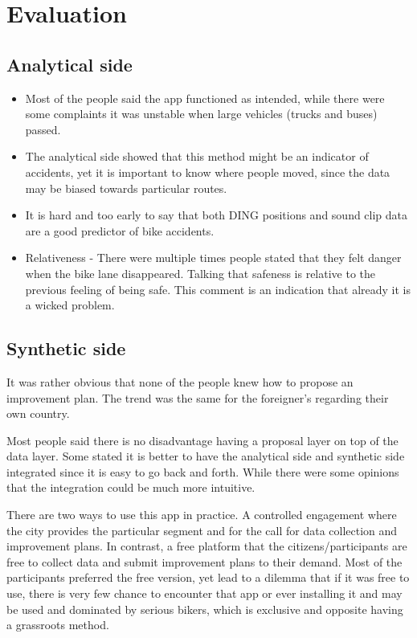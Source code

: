 \section{Evaluation}
\subsection{Analytical side}
\begin{itemize}
  \item Most of the people said the app functioned as intended, while there
    were some complaints it was unstable when large vehicles (trucks and buses) passed.
  \item The analytical side showed that this method might be an indicator
    of accidents, yet it is important to know where people moved, since the
    data may be biased towards particular routes.
  \item It is hard and too early to say that both DING positions and sound
    clip data are a good predictor of bike accidents.
  \item Relativeness - There were multiple times people stated that they
    felt danger when the bike lane disappeared. Talking that safeness is
    relative to the previous feeling of being safe. This comment is an
    indication that already it is a wicked problem.
\end{itemize}

\subsection{Synthetic side}
\item It was rather obvious that none of the people knew how to propose an
  improvement plan. The trend was the same for the foreigner's regarding
  their own country.
\item Most people said there is no disadvantage having a proposal layer on
  top of the data layer. Some stated it is better to have the analytical
  side and synthetic side integrated since it is easy to go back and forth.
  While there were some opinions that the integration could be much more
  intuitive.
\item There are two ways to use this app in practice. A controlled
  engagement where the city provides the particular segment and for  the
  call for data collection and improvement plans. In contrast, a free
  platform that the citizens/participants are free to collect data and
  submit improvement plans to their demand. Most of the participants
  preferred the free version, yet lead to a dilemma that if it was free to
  use, there is very few chance to encounter that app or ever installing it
  and may be used and dominated by serious bikers, which is exclusive and
  opposite having a grassroots method.

